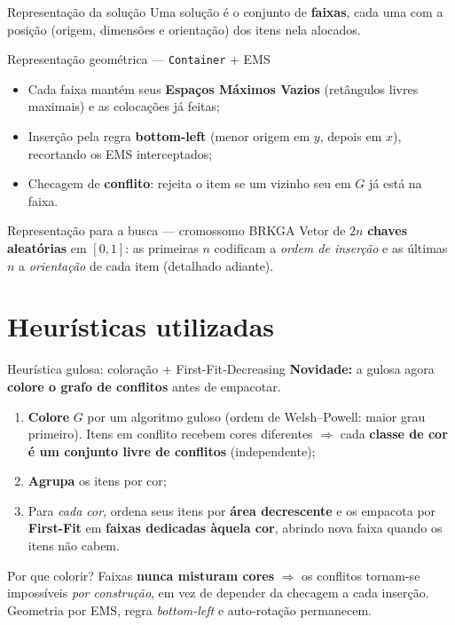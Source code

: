 \documentclass[aspectratio=169]{beamer}
\begin{document}
\begin{frame}{Representação da solução}
  Uma solução é o conjunto de \textbf{faixas}, cada uma com a posição (origem,
  dimensões e orientação) dos itens nela alocados.
  \begin{block}{Representação geométrica --- \texttt{Container} + EMS}
    \begin{itemize}
      \item Cada faixa mantém seus \textbf{Espaços Máximos Vazios} (retângulos
            livres maximais) e as colocações já feitas;
      \item Inserção pela regra \textbf{bottom-left} (menor origem em $y$, depois
            em $x$), recortando os EMS interceptados;
      \item Checagem de \textbf{conflito}: rejeita o item se um vizinho seu em
            $G$ já está na faixa.
    \end{itemize}
  \end{block}
  \begin{block}{Representação para a busca --- cromossomo BRKGA}
    Vetor de $2n$ \textbf{chaves aleatórias} em $[0,1]$: as primeiras $n$
    codificam a \emph{ordem de inserção} e as últimas $n$ a \emph{orientação} de
    cada item (detalhado adiante).
  \end{block}
\end{frame}

\section{Heurísticas utilizadas}

\begin{frame}{Heurística gulosa: coloração + First-Fit-Decreasing}
  \textbf{Novidade:} a gulosa agora \textbf{colore o grafo de conflitos} antes de
  empacotar.
  \begin{enumerate}
    \item \textbf{Colore} $G$ por um algoritmo guloso (ordem de Welsh--Powell:
          maior grau primeiro). Itens em conflito recebem cores diferentes
          $\Rightarrow$ cada \textbf{classe de cor é um conjunto livre de
          conflitos} (independente);
    \item \textbf{Agrupa} os itens por cor;
    \item Para \emph{cada cor}, ordena seus itens por \textbf{área decrescente} e
          os empacota por \textbf{First-Fit} em \textbf{faixas dedicadas àquela
          cor}, abrindo nova faixa quando os itens não cabem.
  \end{enumerate}
  \vspace{0.3em}
  \begin{block}{Por que colorir?}
    Faixas \textbf{nunca misturam cores} $\Rightarrow$ os conflitos tornam-se
    impossíveis \emph{por construção}, em vez de depender da checagem a cada
    inserção. Geometria por EMS, regra \textit{bottom-left} e auto-rotação
    permanecem.
  \end{block}
\end{frame}
\end{document}
